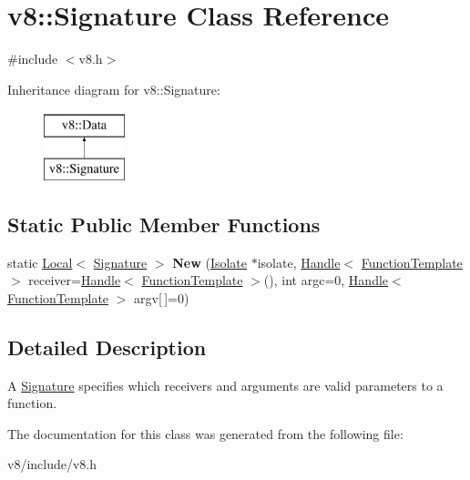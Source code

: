 \hypertarget{classv8_1_1Signature}{\section{v8\-:\-:Signature Class Reference}
\label{classv8_1_1Signature}
}


{\ttfamily \#include $<$v8.\-h$>$}

Inheritance diagram for v8\-:\-:Signature\-:\begin{figure}[H]
\begin{center}
\leavevmode
\includegraphics[height=2.000000cm]{classv8_1_1Signature}
\end{center}
\end{figure}
\subsection*{Static Public Member Functions}
\begin{DoxyCompactItemize}
\item 
\hypertarget{classv8_1_1Signature_a224e53e7ea0fc91b32758daf8b9a8718}{static \hyperlink{classv8_1_1Local}{Local}$<$ \hyperlink{classv8_1_1Signature}{Signature} $>$ {\bfseries New} (\hyperlink{classv8_1_1Isolate}{Isolate} $\ast$isolate, \hyperlink{classv8_1_1Handle}{Handle}$<$ \hyperlink{classv8_1_1FunctionTemplate}{Function\-Template} $>$ receiver=\hyperlink{classv8_1_1Handle}{Handle}$<$ \hyperlink{classv8_1_1FunctionTemplate}{Function\-Template} $>$(), int argc=0, \hyperlink{classv8_1_1Handle}{Handle}$<$ \hyperlink{classv8_1_1FunctionTemplate}{Function\-Template} $>$ argv\mbox{[}$\,$\mbox{]}=0)}\label{classv8_1_1Signature_a224e53e7ea0fc91b32758daf8b9a8718}

\end{DoxyCompactItemize}


\subsection{Detailed Description}
A \hyperlink{classv8_1_1Signature}{Signature} specifies which receivers and arguments are valid parameters to a function. 

The documentation for this class was generated from the following file\-:\begin{DoxyCompactItemize}
\item 
v8/include/v8.\-h\end{DoxyCompactItemize}
